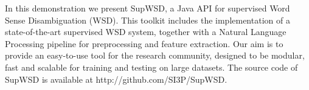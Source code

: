 In this demonstration we present SupWSD, a Java API for supervised Word Sense Disambiguation (WSD). This toolkit includes the implementation of a state-of-the-art supervised WSD system, together with a Natural Language Processing pipeline for preprocessing and feature extraction. Our aim is to provide an easy-to-use tool for the research community, designed to be modular, fast and scalable for training and testing on large datasets. The source code of SupWSD is available at http://github.com/SI3P/SupWSD.

